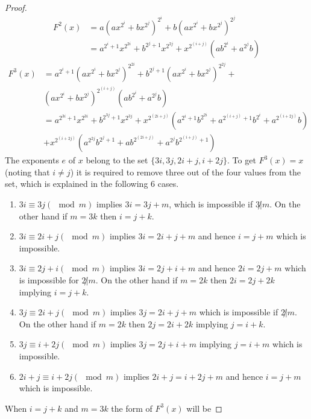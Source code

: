 \documentclass[12pt,a4paper]{article}
\begin{document}
\begin{proof}
	\begin{equation}
		\begin{split}
			F^{2}(x)&=a(ax^{2^{i}}+bx^{2^{j}})^{2^{i}}+b(ax^{2^{i}}+bx^{2^{j}})^{2^{j}}\\
			&=a^{2^{i}+1}x^{2^{2i}}+b^{2^{j}+1}x^{2^{2j}}+x^{2^{(i+j)}}(ab^{2^{i}}+a^{2^{j}}b)
		\end{split}
	\end{equation}
	\begin{equation}
		\begin{split}
			F^{3}(x)&=a^{2^{i}+1}(ax^{2^{i}}+bx^{2^{j}})^{2^{2i}}+b^{2^{j}+1}(ax^{2^{i}}+bx^{2^{j}})^{2^{2j}}+\\
   &(ax^{2^{i}}+bx^{2^{j}})^{2^{(i+j)}}(ab^{2^{i}}+a^{2^{j}}b)\\
			&=a^{2^{3i}+1}x^{2^{3i}}+b^{2^{3j}+1}x^{2^{3j}}+x^{2^{(2i+j)}}(a^{2^{i}+1}b^{2^{2i}}+a^{2^{(i+j)}+1}b^{2^{i}}+a^{2^{(i+2j)}}b)\\
			&+x^{2^{(i+2j)}}(a^{2^{2j}}b^{2^{j}+1}+ab^{2^{(2i+j)}}+a^{2^{j}}b^{2^{(i+j)}+1})	
		\end{split}	
	\end{equation}
	The exponents $ e $ of $ x $  belong to the set $\{3i,3j,2i+j,i+2j\}$. To get $ F^{3}(x)=x $ (noting that $ i\not=j $) it is required to remove three out of the four values from the set, which is explained in the following 6 cases.
	\begin{enumerate}
		\item  $ 3i\equiv3j(\mod m) $ implies $ 3i=3j+m $, which is impossible if $ 3\not|m $. On the other hand if $  m=3k $ then $ i=j+k $.
		\item $ 3i\equiv2i+j(\mod m) $ implies $ 3i=2i+j+m $ and hence $ i=j+m $ which is impossible. 
		\item $ 3i\equiv2j+i(\mod m) $ implies $ 3i=2j+i+m $ and hence $ 2i=2j+m $ which is impossible for $2\not|m$. On the other hand if $ m=2k $ then $ 2i=2j+2k $ implying  $ i=j+k $.
		\item $ 3j\equiv2i+j(\mod m) $ implies $ 3j=2i+j+m $ which is impossible if $2\not|m$. On the other hand if $ m=2k $ then $ 2j=2i+2k $ implying $ j=i+k $.
		\item $ 3j\equiv i+2j(\mod m) $ implies  $ 3j=2j+i+m $ implying $ j=i+m $ which is impossible.
		\item $ 2i+j\equiv i+2j(\mod m) $ implies $ 2i+j=i+2j+m $ and hence $ i=j+m $ which is impossible.
	\end{enumerate}
	When $ i=j+k $ and $ m=3k $ the form of  $ F^{3}(x) $ will be

\end{proof}
\end{document}
